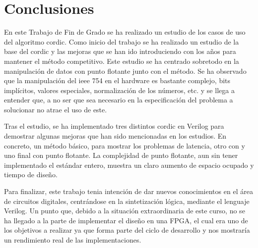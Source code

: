 
\chapter{Conclusiones}
\label{conclusiones}

En este Trabajo de Fin de Grado se ha realizado un estudio de los casos de uso del algoritmo \gls{cordic}. Como inicio del trabajo se ha realizado un estudio de la base del \gls{cordic} y las mejoras que se han ido introduciendo con los años para mantener el método competitivo. Este estudio se ha centrado sobretodo en la manipulación de datos con punto flotante junto con el método. Se ha observado que la manipulación del \gls{ieee} 754 en el hardware es bastante complejo, bits implícitos, valores especiales, normalización de los números, etc. y se llega a entender que, a no ser que sea necesario en la especificación del problema a solucionar no atrae el uso de este.

Tras el estudio, se ha implementado tres distintos \gls{cordic} en Verilog para demostrar algunas mejoras que han sido mencionadas en los estudios. En concreto, un método básico, para mostrar los problemas de latencia, otro con  y uno final con punto flotante. La complejidad de punto flotante, aun sin tener implementado el estándar entero, muestra un claro aumento de espacio ocupado y tiempo de diseño.

Para finalizar, este trabajo tenia intención de dar nuevos conocimientos en el área de circuitos digitales, centrándose en la sintetización lógica, mediante el lenguaje Verilog. Un punto que, debido a la situación extraordinaria de este curso, no se ha llegado a la parte de implementar el diseño en una FPGA, el cual era uno de los objetivos a realizar ya que forma parte del ciclo de desarrollo y nos mostraría un rendimiento real de las implementaciones.




















